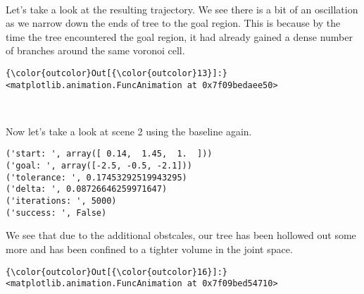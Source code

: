 \documentclass{article}
\begin{document}
    \begin{center}
    \end{center}
    { \hspace*{\fill} \\}
    
    Let's take a look at the resulting trajectory. We see there is a bit of
an oscillation as we narrow down the ends of tree to the goal region.
This is because by the time the tree encountered the goal region, it had
already gained a dense number of branches around the same voronoi cell.


            \begin{Verbatim}[commandchars=\\\{\}]
{\color{outcolor}Out[{\color{outcolor}13}]:} <matplotlib.animation.FuncAnimation at 0x7f09bedaee50>
\end{Verbatim}
        
    \begin{center}
    \end{center}
    { \hspace*{\fill} \\}
    
    Now let's take a look at scene 2 using the baseline again.


    \begin{Verbatim}[commandchars=\\\{\}]
('start: ', array([ 0.14,  1.45,  1.  ]))
('goal: ', array([-2.5, -0.5, -2.1]))
('tolerance: ', 0.17453292519943295)
('delta: ', 0.08726646259971647)
('iterations: ', 5000)
('success: ', False)
    \end{Verbatim}

    We see that due to the additional obstcales, our tree has been hollowed
out some more and has been confined to a tighter volume in the joint
space.



            \begin{Verbatim}[commandchars=\\\{\}]
{\color{outcolor}Out[{\color{outcolor}16}]:} <matplotlib.animation.FuncAnimation at 0x7f09bed54710>
\end{Verbatim}
        
    \begin{center}
    \end{center}
    { \hspace*{\fill} \\}
    
\end{document}
